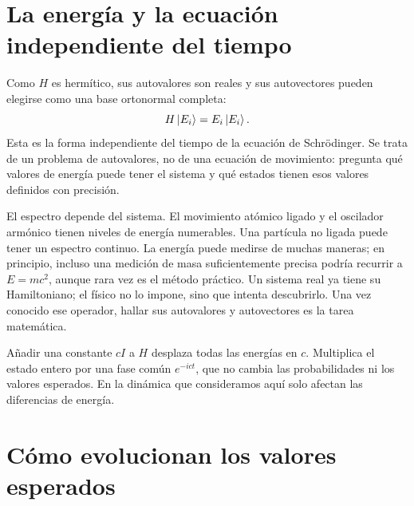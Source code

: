 \begin{classroomqa}\end{classroomqa}

\section{La energía y la ecuación independiente del tiempo}

Como \(H\) es hermítico, sus autovalores son reales y sus autovectores pueden elegirse como una base ortonormal completa:
\begin{equation}
H\left\lvert E_i\right\rangle=E_i\left\lvert E_i\right\rangle.
\label{eq:l5-time-independent}
\end{equation}
Esta es la forma independiente del tiempo de la ecuación de Schr\"odinger. Se trata de un problema de autovalores, no de una ecuación de movimiento: pregunta qué valores de energía puede tener el sistema y qué estados tienen esos valores definidos con precisión.

El espectro depende del sistema. El movimiento atómico ligado y el oscilador armónico tienen niveles de energía numerables. Una partícula no ligada puede tener un espectro continuo. La energía puede medirse de muchas maneras; en principio, incluso una medición de masa suficientemente precisa podría recurrir a \(E=mc^2\), aunque rara vez es el método práctico. Un sistema real ya tiene su Hamiltoniano; el físico no lo impone, sino que intenta descubrirlo. Una vez conocido ese operador, hallar sus autovalores y autovectores es la tarea matemática.

Añadir una constante \(cI\) a \(H\) desplaza todas las energías en \(c\). Multiplica el estado entero por una fase común \(e^{-ict}\), que no cambia las probabilidades ni los valores esperados. En la dinámica que consideramos aquí solo afectan las diferencias de energía.

\section{Cómo evolucionan los valores esperados}

